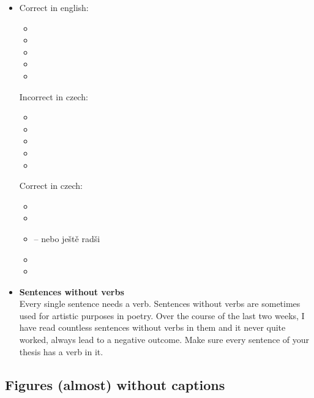 \begin{itemize}
	\item{
    	Correct in english:
		\begin{itemize}
  			\item{}
  			\item{}
  			\item{}
  			\item{}
  			\item{}
		\end{itemize}
        
        Incorrect in czech:
        \begin{itemize}
          \item{}
          \item{}
          \item{}
          \item{}
          \item{}
        \end{itemize}
        
        Correct in czech:
        \begin{itemize}
          \item{}
          \item{}
          \item{ -- nebo ještě radši }
          \item{}
          \item{}
        \end{itemize}
    }
    \item{
    	\textbf{Sentences without verbs} \\
        Every single sentence needs a verb. Sentences without verbs are sometimes used for artistic purposes in poetry. Over the course of the last two weeks, I have read countless sentences without verbs in them and it never quite worked, always lead to a negative outcome. Make sure every sentence of your thesis has a verb in it.
    }
\end{itemize}

\subsection*{Figures (almost) without captions}

